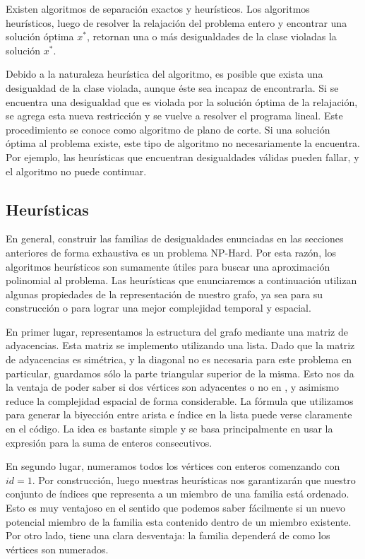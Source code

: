 Existen algoritmos de separación exactos y heurísticos. Los algoritmos heurísticos, luego de resolver la relajación del problema entero y encontrar una solución óptima $x^*$, retornan una o más desigualdades de la clase violadas la solución $x^*$.

Debido a la naturaleza heurística del algoritmo, es posible que exista una desigualdad de la clase violada, aunque éste sea incapaz de encontrarla. Si se encuentra una desigualdad que es violada por la solución óptima de la relajación, se agrega esta nueva restricción y se vuelve a resolver el programa lineal. Este procedimiento se conoce como algoritmo de plano de corte. Si una solución óptima al problema existe, este tipo de algoritmo no necesariamente la encuentra. Por ejemplo, las heurísticas que encuentran desigualdades válidas pueden fallar, y el algoritmo no puede continuar.

\subsection{Heurísticas}

En general, construir las familias de desigualdades enunciadas en las secciones anteriores de forma exhaustiva es un problema NP-Hard. Por esta razón, los algoritmos heurísticos son sumamente útiles para buscar una aproximación polinomial al problema. Las heurísticas que enunciaremos a continuación utilizan algunas propiedades de la representación de nuestro grafo, ya sea para su construcción o para lograr una mejor complejidad temporal y espacial.

En primer lugar, representamos la estructura del grafo mediante una matriz de adyacencias. Esta matriz se implemento utilizando una lista. Dado que la matriz de adyacencias es simétrica, y la diagonal no es necesaria para este problema en particular, guardamos sólo la parte triangular superior de la misma. Esto nos da la ventaja de poder saber si dos vértices son adyacentes o no en , y asimismo reduce la complejidad espacial de forma considerable. La fórmula que utilizamos para generar la biyección entre arista e índice en la lista puede verse claramente en el código. La idea es bastante simple y se basa principalmente en usar la expresión para la suma de enteros consecutivos.

En segundo lugar, numeramos todos los vértices con enteros comenzando con $id = 1$. Por construcción, luego nuestras heurísticas nos garantizarán que nuestro conjunto de índices que representa a un miembro de una familia está ordenado. Esto es muy ventajoso en el sentido que podemos saber fácilmente si un nuevo potencial miembro de la familia esta contenido dentro de un miembro existente. Por otro lado, tiene una clara desventaja: la familia dependerá de como los vértices son numerados.

